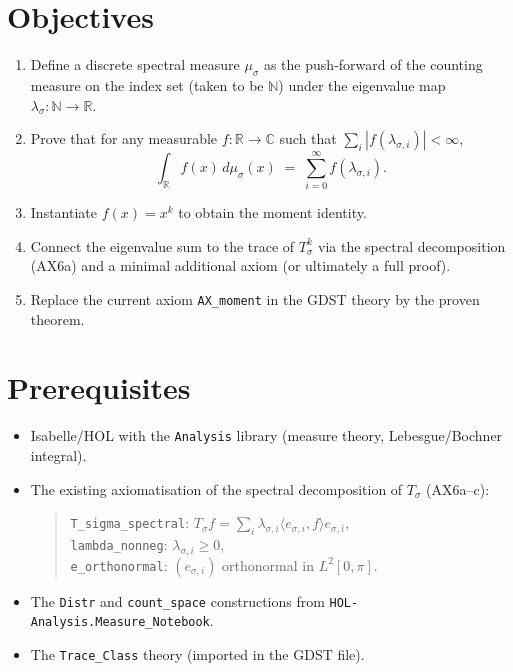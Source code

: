\documentclass[12pt,a4paper]{article}
\begin{document}
\section{Objectives}
\begin{enumerate}[label=(\arabic*)]
    \item Define a discrete spectral measure $\mu_\sigma$ as the push‑forward of the counting 
          measure on the index set (taken to be $\mathbb{N}$) under the eigenvalue map 
          $\lambda_\sigma : \mathbb{N} \to \mathbb{R}$.
    \item Prove that for any measurable $f:\mathbb{R}\to\mathbb{C}$ such that 
          $\sum_{i} |f(\lambda_{\sigma,i})| < \infty$,
          \[
          \int_{\mathbb{R}} f(x)\, d\mu_\sigma(x) \;=\; \sum_{i=0}^\infty f(\lambda_{\sigma,i}).
          \]
    \item Instantiate $f(x)=x^k$ to obtain the moment identity.
    \item Connect the eigenvalue sum to the trace of $T_\sigma^k$ via the spectral decomposition 
          (AX6a) and a minimal additional axiom (or ultimately a full proof).
    \item Replace the current axiom \texttt{AX\_moment} in the GDST theory by the proven theorem.
\end{enumerate}

\section{Prerequisites}
\begin{itemize}
    \item Isabelle/HOL with the \texttt{Analysis} library (measure theory, Lebesgue/Bochner 
          integral).
    \item The existing axiomatisation of the spectral decomposition of $T_\sigma$ (AX6a–c):
          \begin{quote}
          \texttt{T\_sigma\_spectral}: $T_\sigma f = \sum_i \lambda_{\sigma,i} \langle e_{\sigma,i}, f\rangle e_{\sigma,i}$,\\
          \texttt{lambda\_nonneg}: $\lambda_{\sigma,i} \ge 0$,\\
          \texttt{e\_orthonormal}: $(e_{\sigma,i})$ orthonormal in $L^2[0,\pi]$.
          \end{quote}
    \item The \texttt{Distr} and \texttt{count\_space} constructions from 
          \texttt{HOL-Analysis.Measure\_Notebook}.
    \item The \texttt{Trace\_Class} theory (imported in the GDST file).
\end{itemize}
\end{document}
